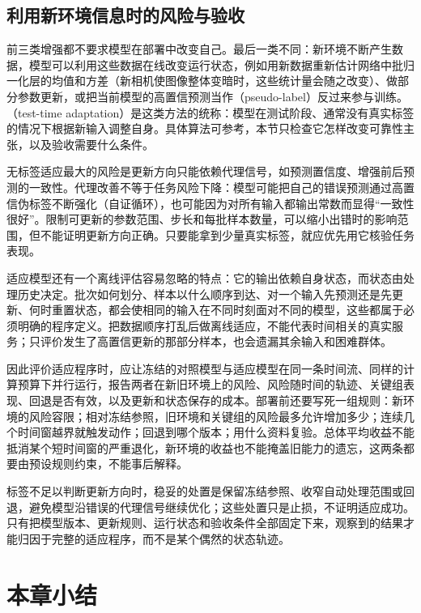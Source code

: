\subsection{利用新环境信息时的风险与验收}
\label{sec:robustness-adaptation}

前三类增强都不要求模型在部署中改变自己。最后一类不同：新环境不断产生数据，模型可以利用这些数据在线改变运行状态，例如用新数据重新估计网络中批归一化层的均值和方差（新相机使图像整体变暗时，这些统计量会随之改变）、做部分参数更新，或把当前模型的高置信预测当作（pseudo-label）反过来参与训练。（test-time adaptation）是这类方法的统称：模型在测试阶段、通常没有真实标签的情况下根据新输入调整自身。具体算法可参考，本节只检查它怎样改变可靠性主张，以及验收需要什么条件。

无标签适应最大的风险是更新方向只能依赖代理信号，如预测置信度、增强前后预测的一致性。代理改善不等于任务风险下降：模型可能把自己的错误预测通过高置信伪标签不断强化（自证循环），也可能因为对所有输入都输出常数而显得“一致性很好”。限制可更新的参数范围、步长和每批样本数量，可以缩小出错时的影响范围，但不能证明更新方向正确。只要能拿到少量真实标签，就应优先用它核验任务表现。

适应模型还有一个离线评估容易忽略的特点：它的输出依赖自身状态，而状态由处理历史决定。批次如何划分、样本以什么顺序到达、对一个输入先预测还是先更新、何时重置状态，都会使相同的输入在不同时刻面对不同的模型，这些都属于必须明确的程序定义。把数据顺序打乱后做离线适应，不能代表时间相关的真实服务；只评价发生了高置信更新的那部分样本，也会遗漏其余输入和困难群体。

因此评价适应程序时，应让冻结的对照模型与适应模型在同一条时间流、同样的计算预算下并行运行，报告两者在新旧环境上的风险、风险随时间的轨迹、关键组表现、回退是否有效，以及更新和状态保存的成本。部署前还要写死一组规则：新环境的风险容限；相对冻结参照，旧环境和关键组的风险最多允许增加多少；连续几个时间窗越界就触发动作；回退到哪个版本；用什么资料复验。总体平均收益不能抵消某个短时间窗的严重退化，新环境的收益也不能掩盖旧能力的遗忘，这两条都要由预设规则约束，不能事后解释。

标签不足以判断更新方向时，稳妥的处置是保留冻结参照、收窄自动处理范围或回退，避免模型沿错误的代理信号继续优化；这些处置只是止损，不证明适应成功。只有把模型版本、更新规则、运行状态和验收条件全部固定下来，观察到的结果才能归因于完整的适应程序，而不是某个偶然的状态轨迹。

\section{本章小结}
\label{sec:robustness-summary}

